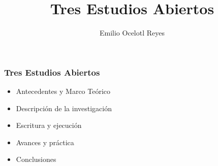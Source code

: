 \documentclass[12pt,letterpaper]{beamer}
\title{Tres Estudios Abiertos}
\author{Emilio Ocelotl Reyes}
\institute{Posgrado en Música UNAM \\ Doctorado en Música (Tecnología Musical) }
\begin{document}
\frame{\titlepage}

\begin{frame}

\frametitle{Tres Estudios Abiertos}

\begin{itemize}

\item Antecedentes y Marco Teórico
\item Descripción de la investigación
\item Escritura y ejecución
\item Avances y práctica
\item Conclusiones 
  
\end{itemize}

\end{frame}
\end{document}
